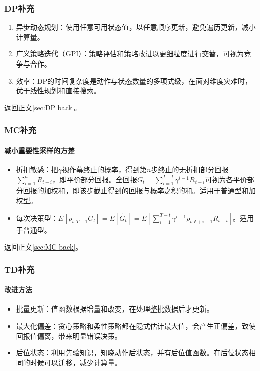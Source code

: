 \documentclass[
12pt, %
a4paper, 
oneside, %
headinclude,footinclude, %
]{scrartcl}
\begin{document}
\subsubsection[DP补充]{DP补充}\label{sec:DP}
\begin{enumerate}
\item 异步动态规划：使用任意可用状态值，以任意顺序更新，避免遍历更新，减小计算量。
\item 广义策略迭代（GPI）：策略评估和策略改进以更细粒度进行交替，可视为竞争与合作。
\item 效率：DP的时间复杂度是动作与状态数量的多项式级，在面对维度灾难时，优于线性规划和直接搜索。
\end{enumerate}

返回正文\ref{sec:DP back}。
\subsubsection[MC补充]{MC补充}
\paragraph{减小重要性采样的方差}\label{sec:MC}
\begin{itemize}
\item 折扣敏感：把$ \gamma $视作幕终止的概率，得到第$ n $步终止的无折扣部分回报$ \sum_{i = 1}^n R_{t + i} $，即平价部分回报。全回报$ G_t = \sum_{i = 1}^{T - t} \gamma^{i - 1}R_{t + i} $可视为各平价部分回报的加权和，即该步截止得到的回报与概率之积的和。适用于普通型和加权型。
\item 每次决策型：$ E[\rho_{t:T - 1}G_t] = E[\tilde{G_t}] = E[\sum_{i = 1}^{T - t} \gamma^{i - 1} \rho_{t:t + i - 1}R_{t + i}] $。适用于普通型。
\end{itemize}

返回正文\ref{sec:MC back}。
\subsubsection[TD补充]{TD补充}\label{sec:TD}
\paragraph{改进方法}
\begin{itemize}
\item 批量更新：值函数根据增量和改变，在处理整批数据后才更新。
\item 最大化偏差：贪心策略和柔性策略都在隐式估计最大值，会产生正偏差，致使回报值偏离，带来明显错误决策。
\item 后位状态：利用先验知识，知晓动作后状态，并有后位值函数。在后位状态相同的时候可以迁移，减少计算量。
\end{itemize}
\end{document}
